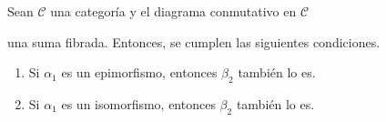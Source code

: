 \documentclass[tesis]{subfiles}
\begin{document}
\begin{Coro} \label{Mendoza-Ejer.8(a)*}
    Sean $\mathscr{C}$ una categoría y el diagrama conmutativo en $\mathscr{C}$
    \begin{center}
    \end{center}
    una suma fibrada. Entonces, se cumplen las siguientes condiciones.

    \begin{enumerate}[label=(\alph*)]
    
        \item Si $\alpha_1$ es un epimorfismo, entonces $\beta_2$ también lo es.

        \item Si $\alpha_1$ es un isomorfismo, entonces $\beta_2$ también lo es.
    \end{enumerate}
\end{Coro}
\end{document}
